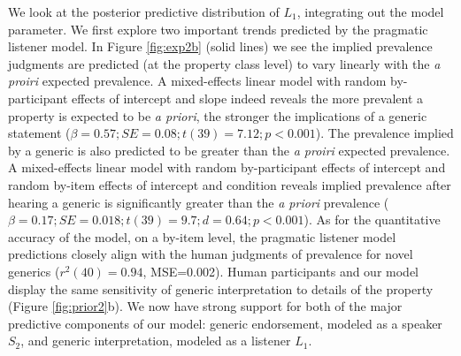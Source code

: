 \documentclass[12pt,letterpaper]{article}
\newcommand{\mht}[1]{\textcolor{Blue}{[mht: #1]}}
\begin{document}
We look at the posterior predictive distribution of $L_1$, integrating out the model parameter.
We first explore two important trends predicted by the pragmatic listener model.
In Figure \ref{fig:exp2b} (solid lines) we see the implied prevalence judgments are predicted (at the property class level) to vary linearly with the \emph{a proiri} expected prevalence. 
A mixed-effects linear model with random by-participant effects of intercept and slope indeed reveals the more prevalent a property is expected to be \emph{a priori}, the stronger the implications of a generic statement ($\beta = 0.57; SE = 0.08; t(39) = 7.12; p < 0.001$).
The prevalence implied by a generic is also predicted to be greater than the \emph{a proiri} expected prevalence.
A mixed-effects linear model with random by-participant effects of intercept and random by-item effects of intercept and condition reveals implied prevalence after hearing a generic is significantly greater than the \emph{a priori} prevalence ($\beta = 0.17; SE = 0.018; t(39) = 9.7; d = 0.64; p < 0.001$).
As for the quantitative accuracy of the model, on a by-item level, the pragmatic listener model predictions closely align with the human judgments of prevalence for novel generics ($r^2(40)=0.94$, MSE=0.002).
Human participants and our model display the same sensitivity of generic interpretation to details of the property (Figure \ref{fig:prior2}b). 
We now have strong support for both of the major predictive components of our model: generic endorsement, modeled as a speaker $S_2$, and generic interpretation, modeled as a listener $L_1$.

\end{document}
